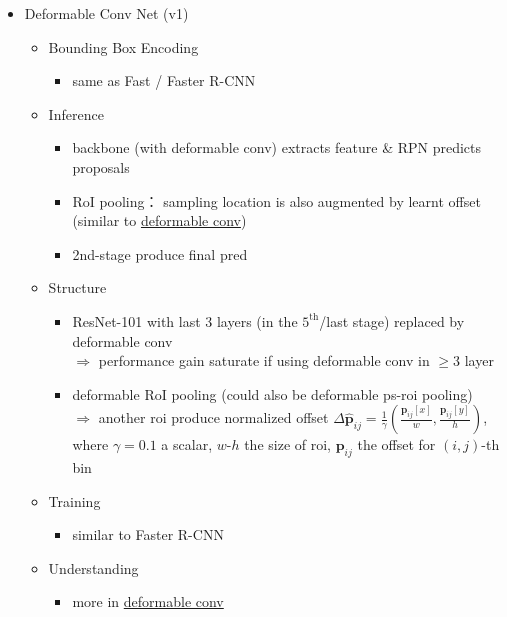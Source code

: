 \begin{itemize}
\item Deformable Conv Net (v1)
	\begin{itemize}
	\item Bounding Box Encoding
		\begin{itemize}
		\item same as Fast / Faster R-CNN
		\end{itemize}
	\item Inference
		\begin{itemize}
		\item backbone (with deformable conv) extracts feature \& RPN predicts proposals
		\item RoI pooling： sampling location is also augmented by learnt offset \\ 
		(similar to \hyperref[DL_Layers_DeformableConv]{deformable conv})
		\item 2nd-stage produce final pred
		\end{itemize}
	\item Structure
		\begin{itemize}
		\item ResNet-101 with last 3 layers (in the $5^\text{th}$/last stage) replaced by deformable conv \\
		$\Rightarrow$ performance gain saturate if using deformable conv in $\ge3$ layer
		\item deformable RoI pooling (could also be deformable ps-roi pooling) \\
		$\Rightarrow$ another roi produce normalized offset $\Delta \hat{\mathbf p}_{ij}=\frac 1 \gamma (\frac{\mathbf p_{ij}[x]}{w}, \frac{\mathbf p_{ij}[y]}{h})$, \\
		where $\gamma=0.1$ a scalar, $w$-$h$ the size of roi, $\mathbf p_{ij}$ the offset for $(i,j)$-th bin
		\end{itemize}
	\item Training
		\begin{itemize}
		\item similar to Faster R-CNN
		\end{itemize}
	\item Understanding
		\begin{itemize}
		\item more in \hyperref[DL_Layers_DeformableConv]{deformable conv}
		\end{itemize}
	\end{itemize}
\end{itemize}

